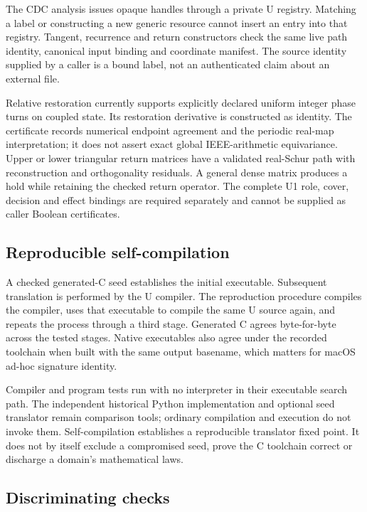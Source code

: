 \documentclass[11pt]{article}
\theoremstyle{remark}
\begin{document}
The CDC analysis issues opaque handles through a private U registry.
Matching a label or constructing a new generic resource cannot insert an
entry into that registry. Tangent, recurrence and return constructors check
the same live path identity, canonical input binding and coordinate manifest.
The source identity supplied by a caller is a bound label, not an
authenticated claim about an external file.

Relative restoration currently supports explicitly declared uniform integer
phase turns on coupled state. Its restoration derivative is constructed as
identity. The certificate records numerical endpoint agreement and the
periodic real-map interpretation; it does not assert exact global
IEEE-arithmetic equivariance. Upper or lower triangular return matrices have
a validated real-Schur path with reconstruction and orthogonality residuals.
A general dense matrix produces a hold while retaining the checked return
operator. The complete U1 role, cover, decision and effect bindings are
required separately and cannot be supplied as caller Boolean certificates.

\subsection{Reproducible self-compilation}

A checked generated-C seed establishes the initial executable. Subsequent
translation is performed by the U compiler. The reproduction procedure
compiles the compiler, uses that executable to compile the same U source
again, and repeats the process through a third stage. Generated C agrees
byte-for-byte across the tested stages. Native executables also agree under
the recorded toolchain when built with the same output basename, which
matters for macOS ad-hoc signature identity.

Compiler and program tests run with no interpreter in their executable search
path. The independent historical Python implementation and optional seed
translator remain comparison tools; ordinary compilation and execution do
not invoke them. Self-compilation establishes a reproducible translator
fixed point. It does not by itself exclude a compromised seed, prove the C
toolchain correct or discharge a domain's mathematical laws.

\subsection{Discriminating checks}
\end{document}
